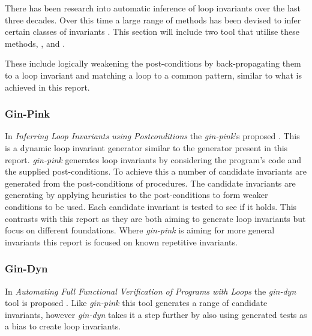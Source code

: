 There has been research into automatic inference of loop invariants over
the last three decades.
Over this time a large range of methods has been devised to infer certain
classes of invariants \cite{infer-dynamic}\cite{infer-postconditions}\cite{struct-induction}.
This section will include two tool that utilise these methods,
 \cite{infer-postconditions}, and  \cite{infer-dynamic}.

These include logically weakening the post-conditions by back-propagating them
to a loop invariant \cite{infer-postconditions}\cite{infer-dynamic} and
matching a loop to a common pattern\cite{pattern-loop-inv}, similar to what is achieved in this
report.


\subsubsection{Gin-Pink}

In \textit{Inferring Loop Invariants using Postconditions} 
the \textit{gin-pink}'s proposed \cite{infer-postconditions}.
This is a dynamic loop invariant generator similar to the generator
present in this report.
\textit{gin-pink} generates loop invariants by considering the program's code
and the supplied post-conditions.
To achieve this a number of candidate invariants are generated from the 
post-conditions of procedures.
The candidate invariants are generating by applying heuristics to the
post-conditions to form weaker conditions to be used.
Each candidate invariant is tested to see if it holds.
This contrasts with this report as they are both aiming to generate loop
invariants but focus on different foundations.
Where \textit{gin-pink} is aiming for more general invariants 
this report is focused on known repetitive invariants.

\subsubsection{Gin-Dyn}

In \textit{Automating Full Functional Verification of Programs with Loops} the
\textit{gin-dyn} tool is proposed \cite{infer-dynamic}.
Like \textit{gin-pink} this tool generates a range of candidate invariants,
however \textit{gin-dyn} takes it a step further by also using generated tests
as a bias to create loop invariants.



